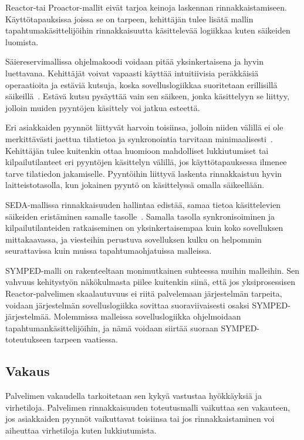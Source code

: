 \documentclass[finnish]{tktltiki2}
\theoremstyle{definition}
\theoremstyle{remark}
\begin{document}
Reactor-tai Proactor-mallit eivät tarjoa keinoja
laskennan rinnakkaistamiseen. Käyttötapauksissa
joissa se on tarpeen, kehittäjän tulee lisätä
mallin tapahtumakäsittelijöihin rinnakkaisuutta käsittelevää
logiikkaa kuten säikeiden luomista.


Säiereservimallissa ohjelmakoodi voidaan pitää yksinkertaisena ja
hyvin luettavana. Kehittäjät voivat vapaasti käyttää intuitiivisia
peräkkäisiä operaatioita ja estäviä kutsuja, koska sovelluslogiikkaa
suoritetaan erillisillä säikeillä~\cite{pyarali_proactor_1997}. Estävä kutsu pysäyttää vain
sen säikeen, jonka käsittelyyn se liittyy, jolloin muiden
pyyntöjen käsittely voi jatkua esteettä.

Eri asiakkaiden pyynnöt liittyvät harvoin toisiinsa,
jolloin niiden välillä ei ole merkittävästi jaettua tilatietoa ja
synkronointia tarvitaan minimaalisesti~\cite{pyarali_proactor_1997}.
Kehittäjän tulee kuitenkin ottaa huomioon mahdolliset lukkiutumiset
tai kilpailutilanteet eri pyyntöjen käsittelyn välillä, jos
käyttötapauksessa ilmenee tarve tilatiedon jakamiselle.
Pyyntöihin liittyvä laskenta rinnakkaistuu hyvin laitteistotasolla,
kun jokainen pyyntö on käsittelyssä omalla säikeellään.

SEDA-mallissa rinnakkaisuuden hallintaa edistää,
samaa tietoa käsittelevien säikeiden eristäminen samalle tasolle~\cite{welsh_seda_2001}.
Samalla tasolla synkronisoiminen ja kilpailutilanteiden ratkaiseminen on
yksinkertaisempaa kuin koko sovelluksen mittakaavassa, ja
viesteihin perustuva sovelluksen kulku on helpommin seurattavissa kuin
muissa tapahtumaohjatuissa malleissa.

SYMPED-malli on rakenteeltaan monimutkainen suhteessa muihin malleihin.
Sen vahvuus kehitystyön näkökulmasta piilee kuitenkin siinä, että
jos yksiprosessisen Reactor-palvelimen skaalautuvuus ei riitä palvelemaan
järjestelmän tarpeita, voidaan järjestelmän sovelluslogiikka
sovittaa suoraviivaisesti osaksi SYMPED-järjestelmää. Molemmissa malleissa
sovelluslogiikka ohjelmoidaan tapahtumankäsittelijöihin, ja nämä voidaan siirtää
suoraan SYMPED-toteutukseen tarpeen vaatiessa.

\subsection{Vakaus}
Palvelimen vakaudella tarkoitetaan sen kykyä vastustaa hyökkäyksiä ja 
virhetiloja.
Palvelimen rinnakkaisuuden toteutusmalli vaikuttaa sen vakauteen, jos asiakkaiden
pyynnöt vaikuttavat toisiinsa tai jos rinnakkaistaminen voi aiheuttaa virhetiloja kuten
lukkiutumista.
\end{document}
